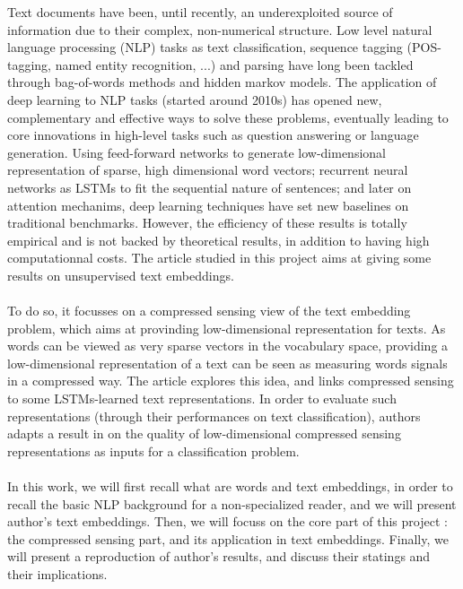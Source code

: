 \documentclass{article}
\begin{document}
Text documents have been, until recently, an underexploited
source of information due to their complex, non-numerical
structure. Low level natural language processing (NLP)
tasks as text classification, 
sequence tagging (POS-tagging, named entity recognition, ...) and 
parsing have long been tackled through bag-of-words methods 
and hidden markov models. The application of deep learning 
to NLP tasks (started around 2010s) has opened new, complementary 
and effective ways to solve these problems, eventually leading to core
innovations in high-level tasks such as question answering or 
language generation. Using feed-forward networks 
to generate low-dimensional representation of sparse, high 
dimensional word vectors; recurrent neural networks as LSTMs
to fit the sequential nature of sentences; and later on attention mechanims,
deep learning techniques have set new baselines on traditional benchmarks. 
However, the efficiency of these results is totally empirical 
and is not backed by theoretical results, in addition to having 
high computationnal costs. The article studied in this project \cite{arora2018sensing}
aims at giving some results on unsupervised text embeddings. 
\\ \\
To do so, it focusses on a compressed sensing view of the text 
embedding problem, which aims at provinding low-dimensional representation
for texts. As words can be viewed 
as very sparse vectors in the vocabulary space, providing a 
low-dimensional representation of a text can be seen as measuring 
words signals in a compressed way. The article explores this idea, 
and links compressed sensing to some LSTMs-learned text representations.
In order to evaluate such representations (through their 
performances on text classification), authors
 adapts a result in \cite{Calderbank2009CompressedL} on the quality
of low-dimensional compressed sensing representations as inputs
for a classification problem. \\ \\
In this work, we will first recall what are words and text embeddings, 
in order to recall the basic NLP background for a non-specialized reader,
and we will present author's text embeddings.
Then, we will focuss on the core part of this project : the compressed 
sensing part, and its application in text embeddings. Finally, we 
will present a reproduction of author's results, and discuss their
 statings and their implications.


\newpage 
\end{document}
